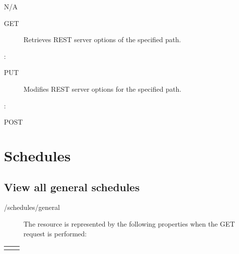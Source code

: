 \documentclass[letterpaper,10pt,english]{sphinxmanual}
\begin{document}
 N/A
\begin{description}
\item[{ GET}] \leavevmode
Retrieves REST server options of the specified path.

\end{description}

:

\begin{sphinxVerbatim}[commandchars=\\\{\}]
\end{sphinxVerbatim}
\begin{description}
\item[{ PUT}] \leavevmode
Modifies REST server options for the specified path.

\end{description}

:

\begin{sphinxVerbatim}[commandchars=\\\{\}]
\end{sphinxVerbatim}

 POST


\section{Schedules}
\label{\detokenize{restapi:schedules}}

\subsection{View all general schedules}
\label{\detokenize{restapi:view-all-general-schedules}}
 /schedules/general
\begin{description}
\item[{}] \leavevmode
The resource is represented by the following properties when the GET request is performed:

\end{description}


\begin{savenotes}\sphinxattablestart
\centering
\begin{tabulary}{\linewidth}[t]{|T|T|}
\hline

&
\\
\hline&\\
\hline
\end{tabulary}
\par
\sphinxattableend\end{savenotes}
\end{document}
